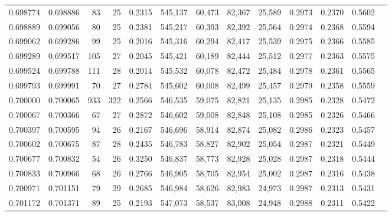 \begin{tabular}{rrrrrrrrrrrrr}
0.698774 & 0.698886 &     83 &    25 &                                     0.2315 & 545,137 &  60,473 &  82,367 &  25,589 & 0.2973 & 0.2370 & 0.5602 \\
0.698889 & 0.699056 &     80 &    25 &                                     0.2381 & 545,217 &  60,393 &  82,392 &  25,564 & 0.2974 & 0.2368 & 0.5594 \\
0.699062 & 0.699286 &     99 &    25 &                                     0.2016 & 545,316 &  60,294 &  82,417 &  25,539 & 0.2975 & 0.2366 & 0.5585 \\
0.699289 & 0.699517 &    105 &    27 &                                     0.2045 & 545,421 &  60,189 &  82,444 &  25,512 & 0.2977 & 0.2363 & 0.5575 \\
0.699524 & 0.699788 &    111 &    28 &                                     0.2014 & 545,532 &  60,078 &  82,472 &  25,484 & 0.2978 & 0.2361 & 0.5565 \\
0.699793 & 0.699991 &     70 &    27 &                                     0.2784 & 545,602 &  60,008 &  82,499 &  25,457 & 0.2979 & 0.2358 & 0.5559 \\
0.700000 & 0.700065 &    933 &   322 &                                     0.2566 & 546,535 &  59,075 &  82,821 &  25,135 & 0.2985 & 0.2328 & 0.5472 \\
0.700067 & 0.700366 &     67 &    27 &                                     0.2872 & 546,602 &  59,008 &  82,848 &  25,108 & 0.2985 & 0.2326 & 0.5466 \\
0.700397 & 0.700595 &     94 &    26 &                                     0.2167 & 546,696 &  58,914 &  82,874 &  25,082 & 0.2986 & 0.2323 & 0.5457 \\
0.700602 & 0.700675 &     87 &    28 &                                     0.2435 & 546,783 &  58,827 &  82,902 &  25,054 & 0.2987 & 0.2321 & 0.5449 \\
0.700677 & 0.700832 &     54 &    26 &                                     0.3250 & 546,837 &  58,773 &  82,928 &  25,028 & 0.2987 & 0.2318 & 0.5444 \\
0.700833 & 0.700966 &     68 &    26 &                                     0.2766 & 546,905 &  58,705 &  82,954 &  25,002 & 0.2987 & 0.2316 & 0.5438 \\
0.700971 & 0.701151 &     79 &    29 &                                     0.2685 & 546,984 &  58,626 &  82,983 &  24,973 & 0.2987 & 0.2313 & 0.5431 \\
0.701172 & 0.701371 &     89 &    25 &                                     0.2193 & 547,073 &  58,537 &  83,008 &  24,948 & 0.2988 & 0.2311 & 0.5422 \\

\end{tabular}
